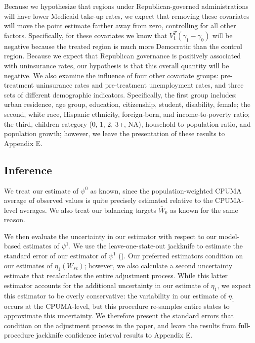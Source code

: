 \documentclass{article}
\begin{document}
Because we hypothesize that regions under Republican-governed administrations will have lower Medicaid take-up rates, we expect that removing these covariates will move the point estimate farther away from zero, controlling for all other factors. Specifically, for these covariates we know that $V_1^T(\gamma_1 - \gamma_0)$ will be negative because the treated region is much more Democratic than the control region. Because we expect that Republican governance is positively associated with uninsurance rates, our hypothesis is that this overall quantity will be negative. We also examine the influence of four other covariate groups: pre-treatment uninsurance rates and pre-treatment unemployment rates, and three sets of different demographic indicators. Specifically, the first group includes: urban residence, age group, education, citizenship, student, disability, female; the second, white race, Hispanic ethnicity, foreign-born, and income-to-poverty ratio; the third, children category (0, 1, 2, 3+, NA), household to population ratio, and population growth; however, we leave the presentation of these results to Appendix E.

\subsection{Inference}

We treat our estimate of $\psi^0$ as known, since the population-weighted CPUMA average of observed values is quite precisely estimated relative to the CPUMA-level averages. We also treat our balancing targets $\bar{W}_0$ as known for the same reason. 

We then evaluate the uncertainty in our estimator with respect to our model-based estimates of $\psi^1$. We use the leave-one-state-out jackknife to estimate the standard error of our estimator of $\psi^1$ (\cite{cameron2015practitioner}). Our preferred estimators condition on our estimates of $\eta_1(W_{sc})$; however, we also calculate a second uncertainty estimate that recalculates the entire adjustment process. While this latter estimator accounts for the additional uncertainty in our estimate of $\eta_1$, we expect this estimator to be overly conservative: the variability in our estimate of $\eta_1$ occurs at the CPUMA-level, but this procedure re-samples entire states to approximate this uncertainty. We therefore present the standard errors that condition on the adjustment process in the paper, and leave the results from full-procedure jackknife confidence interval results to Appendix E. 
\end{document}
